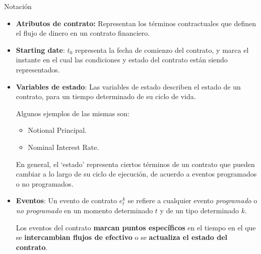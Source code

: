 \documentclass{beamer}
\newcommand{\nologo}{\setbeamertemplate{logo}{}} %
\begin{document}
{\nologo
\begin{frame}{Notación}
\begin{itemize}
    \item \textbf{Atributos de contrato:} Representan los términos contractuales que definen el flujo de dinero en un contrato financiero.
    \pause
    \item \textbf{Starting date}: $t_0$ representa la fecha de comienzo del contrato, y marca el instante en el cual las condiciones y estado del contrato están siendo representados. 
    \pause
    \item \textbf{Variables de estado}: Las variables de estado describen el estado de un contrato, para un tiempo determinado de su ciclo de vida. 

        Algunos ejemplos de las mismas son: 
        \pause
            \begin{itemize}
                \item Notional Principal.
                \item Nominal Interest Rate.
            \end{itemize}
        \pause
        En general, el ‘estado’ representa ciertos términos de un contrato que pueden cambiar a lo largo de su ciclo de ejecución, de acuerdo a eventos programados o no programados. 
\end{itemize}
\end{frame}
}

\begin{frame}
    \begin{itemize}
        \item \textbf{Eventos}: Un evento de contrato $e_t^k$ se refiere a cualquier evento \textit{programado} o \textit{no programado} en un momento determinado $t$ y de un tipo determinado $k$. 
        \vfill

        Los eventos del contrato \textbf{marcan puntos específicos} en el tiempo en el que se \textbf{intercambian flujos de efectivo} o se \textbf{actualiza el estado del contrato}. 
    \end{itemize}
\end{frame}
\end{document}
